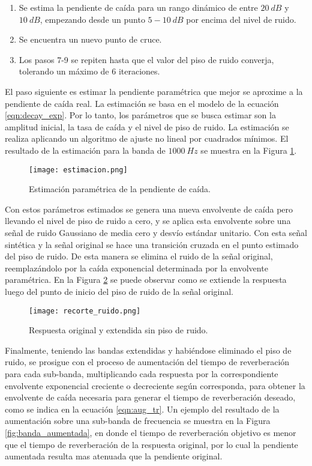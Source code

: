 \begin{enumerate}
\item Se estima la pendiente de caída para un rango dinámico de entre $20 \ dB$ y $10 \ dB$, empezando desde un punto $5-10 \ dB$ por encima del nivel de ruido.

\item Se encuentra un nuevo punto de cruce.

\item Los pasos 7-9 se repiten hasta que el valor del piso de ruido converja, tolerando un máximo de 6 iteraciones.

\end{enumerate}

El paso siguiente es estimar la pendiente paramétrica que mejor se aproxime a la pendiente de caída real. La estimación se basa en el modelo de la ecuación \ref{eqn:decay_exp}. Por lo tanto, los parámetros que se busca estimar son la amplitud inicial, la tasa de caída y el nivel de piso de ruido. La estimación se realiza aplicando un algoritmo de ajuste no lineal por cuadrados mínimos. El resultado de la estimación para la banda de $1000 \ Hz$ se muestra en la Figura  \ref{fig:estimacion_parametrica}.

\begin{figure}[H]
	\centering{}
	\texttt{[image: estimacion.png]}
	\caption{Estimación paramétrica de la pendiente de caída.}
	\label{fig:estimacion_parametrica}
\end{figure}

Con estos parámetros estimados se genera una nueva envolvente de caída pero llevando el nivel de piso de ruido a cero, y se aplica esta envolvente sobre una señal de ruido Gaussiano de media cero y desvío estándar unitario. Con esta señal sintética y la señal original se hace una transición cruzada en el punto estimado del piso de ruido. De esta manera se elimina el ruido de la señal original, reemplazándolo por la caída exponencial determinada por la envolvente paramétrica.  En la Figura \ref{fig:recorte_ruido} se puede observar como se extiende la respuesta luego del punto de inicio del piso de ruido de la señal original.

\begin{figure}[H]
	\centering{}
	\texttt{[image: recorte\_ruido.png]}
	\caption{Respuesta original y extendida sin piso de ruido.}
	\label{fig:recorte_ruido}
\end{figure}
  
Finalmente, teniendo las bandas extendidas y habiéndose eliminado el piso de ruido, se prosigue con el proceso de aumentación del tiempo de reverberación para cada sub-banda, multiplicando cada respuesta por la correspondiente envolvente exponencial creciente o decreciente según corresponda, para obtener la envolvente de caída necesaria para generar el tiempo de reverberación deseado, como se indica en la ecuación \ref{eqn:aug_tr}. Un ejemplo del resultado de la aumentación sobre una sub-banda de frecuencia se muestra en la Figura \ref{fig:banda_aumentada}, en donde el tiempo de reverberación objetivo es menor que el tiempo de reverberación de la respuesta original, por lo cual la pendiente aumentada resulta mas atenuada que la pendiente original. 

